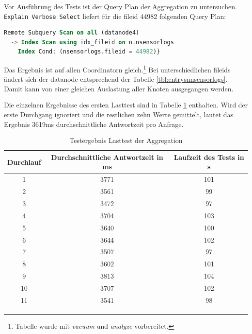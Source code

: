 Vor Ausführung des Tests ist der Query Plan der Aggregation zu untersuchen.\\
\verb+Explain Verbose Select+ liefert für die fileid 44982 folgenden Query Plan:
\begin{lstlisting}[language=sql,caption={Explain Verbose Ergebnis eines Coordinator}]
Remote Subquery Scan on all (datanode4)
  -> Index Scan using idx_fileid on n.nsensorlogs
    Index Cond: (nsensorlogs.fileid = 44982)}
\end{lstlisting}
Das Ergebnis ist auf allen Coordinatorn gleich.\footnote{Tabelle wurde mit \textit{vacuum} und \textit{analyze} vorbereitet.}
Bei unterschiedlichen fileids ändert sich der datanode entsprechend der Tabelle \ref{tbl:entrysnnsensorlogs}.
Damit kann von einer gleichen Auslastung aller Knoten ausgegangen werden.

Die einzelnen Ergebnisse des ersten Lasttest sind in Tabelle \ref{tbl:ergebnisseTest1} enthalten.
Wird der erste Durchgang ignoriert und die restlichen zehn Werte gemittelt, lautet das Ergebnis 3619ms durchschnittliche Antwortzeit pro Anfrage.
\begin{table}[h!]
\centering
\begin{tabular}{c|c|c}
\textbf{Durchlauf} & \textbf{Durchschnittliche Antwortzeit in ms} & \textbf{Laufzeit des Tests in s} \\ \hline
1 & 3771 & 101 \\ \hline
2 & 3561 & 99 \\ \hline
3 & 3472 & 97 \\ \hline
4 & 3704 & 103 \\ \hline 
5 & 3640 & 100 \\ \hline
6 & 3644 & 102 \\ \hline
7 & 3507 & 97 \\ \hline
8 & 3602 & 101 \\ \hline 
9 & 3813 & 104 \\ \hline
10 & 3707 & 102 \\ \hline
11 & 3541 & 98 \\ 			
\end{tabular}
\caption[Testergebnis Lasttest Aggregation]{Testergebnis Lasttest der Aggregation}
\label{tbl:ergebnisseTest1}
\end{table}

